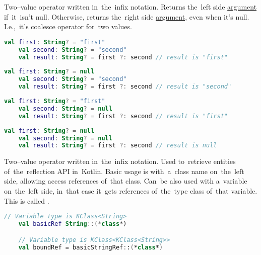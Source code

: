 Two--value operator written in~the~infix notation.
Returns the~left side \hyperref[parameterargument]{argument} if~it~isn't null.
Otherwise, returns the~right side \hyperref[parameterargument]{argument}, even when it's null.
I.e.,~it's coalesce operator for~two values.

\begin{lstlisting}[language=Kotlin]
    val first: String? = "first"
    val second: String? = "second"
    val result: String? = first ?: second // result is "first"
\end{lstlisting}

\begin{lstlisting}[language=Kotlin]
    val first: String? = null
    val second: String? = "second"
    val result: String? = first ?: second // result is "second"
\end{lstlisting}
\newpage

\begin{lstlisting}[language=Kotlin]
    val first: String? = "first"
    val second: String? = null
    val result: String? = first ?: second // result is "first"
\end{lstlisting}

\begin{lstlisting}[language=Kotlin]
    val first: String? = null
    val second: String? = null
    val result: String? = first ?: second // result is null
\end{lstlisting}

\label{kotlinreflection}
Two--value operator written in~the~infix notation.
Used to~retrieve entities of~the~reflection API in~Kotlin.
Basic usage is with~a~class name on~the~left side, allowing access references of~that class.
Can~be also used with a~variable on~the~left side, in~that case it~gets references of~the~type class of~that variable.
This is called .

\begin{lstlisting}[language=Kotlin]
    // Variable type is KClass<String>
    val basicRef String::(*class*)

    // Variable type is KClass<KClass<String>>
    val boundRef = basicStringRef::(*class*)
\end{lstlisting}
\newline

